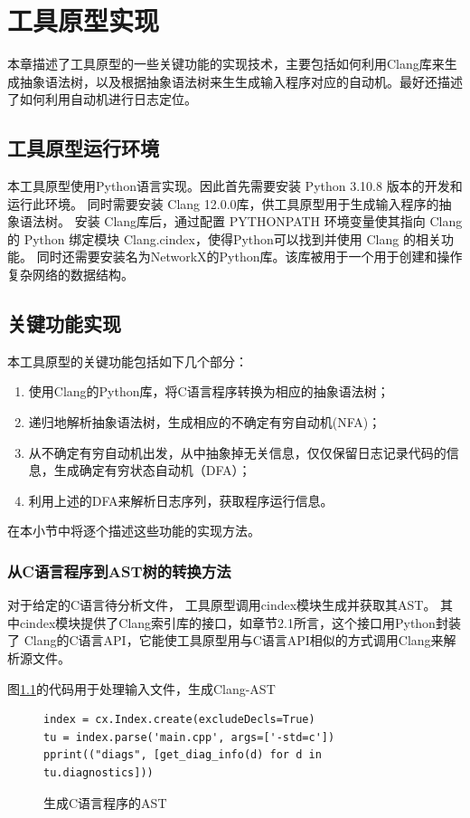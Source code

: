 \chapter{工具原型实现}
本章描述了工具原型的一些关键功能的实现技术，主要包括如何利用Clang库来生成抽象语法树，以及根据抽象语法树来生生成输入程序对应的自动机。最好还描述了如何利用自动机进行日志定位。


\section{工具原型运行环境}
本工具原型使用Python语言实现。因此首先需要安装 Python 3.10.8\cite{python310} 版本的开发和运行此环境。
同时需要安装 Clang 12.0.0\cite{Clang12}库，供工具原型用于生成输入程序的抽象语法树。
安装 Clang库后，通过配置 PYTHONPATH 环境变量使其指向 Clang 的 Python 绑定模块 Clang.cindex，使得Python可以找到并使用 Clang 的相关功能。
同时还需要安装名为NetworkX\cite{networkx}的Python库。该库被用于一个用于创建和操作复杂网络的数据结构。

\section{关键功能实现}
本工具原型的关键功能包括如下几个部分：
\begin{enumerate}
    \item 使用Clang的Python库，将C语言程序转换为相应的抽象语法树；
    \item 递归地解析抽象语法树，生成相应的不确定有穷自动机(NFA)；
    \item 从不确定有穷自动机出发，从中抽象掉无关信息，仅仅保留日志记录代码的信息，生成确定有穷状态自动机（DFA）；
    \item 利用上述的DFA来解析日志序列，获取程序运行信息。
\end{enumerate}
在本小节中将逐个描述这些功能的实现方法。

\subsection{从C语言程序到AST树的转换方法}
对于给定的C语言待分析文件，
工具原型调用cindex模块生成并获取其AST。
其中cindex模块提供了Clang索引库的接口，如章节2.1所言，这个接口用Python封装了
Clang的C语言API，它能使工具原型用与C语言API相似的方式调用Clang来解析源文件。

图\ref{生成C语言程序的AST}的代码用于处理输入文件，生成Clang-AST\\
\begin{figure}[ht]
\centering
\begin{minipage}{12cm}
\begin{lstlisting}
index = cx.Index.create(excludeDecls=True)
tu = index.parse('main.cpp', args=['-std=c'])
pprint(("diags", [get_diag_info(d) for d in tu.diagnostics]))
\end{lstlisting}
\end{minipage}
\caption{生成C语言程序的AST}
\label{生成C语言程序的AST}
\end{figure}

